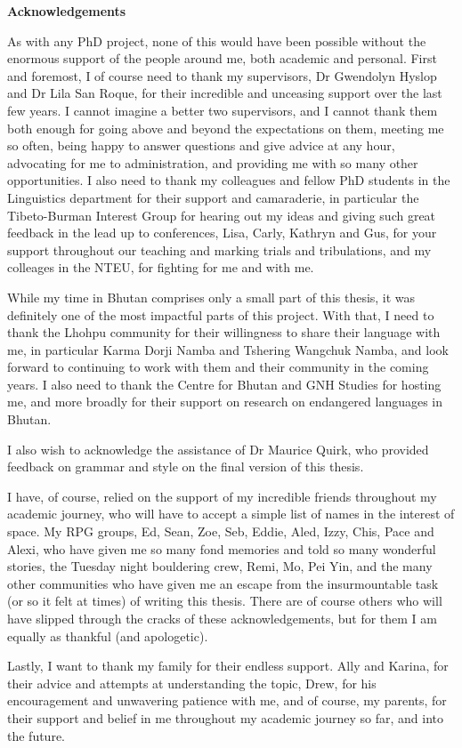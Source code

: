 \newpage
\begin{center}
    \large
    \textbf{Acknowledgements}

\end{center}
\normalsize
As with any PhD project, none of this would have been possible without the enormous support of the people around me, both academic and personal. First and foremost, I of course need to thank my supervisors, Dr Gwendolyn Hyslop and Dr Lila San Roque, for their incredible and unceasing support over the last few years. I cannot imagine a better two supervisors, and I cannot thank them both enough for going above and beyond the expectations on them, meeting me so often, being happy to answer questions and give advice at any hour, advocating for me to administration, and providing me with so many other opportunities. I also need to thank my colleagues and fellow PhD students in the Linguistics department for their support and camaraderie, in particular the Tibeto-Burman Interest Group for hearing out my ideas and giving such great feedback in the lead up to conferences, Lisa, Carly, Kathryn and Gus, for your support throughout our teaching and marking trials and tribulations, and my colleages in the NTEU, for fighting for me and with me.

While my time in Bhutan comprises only a small part of this thesis, it was definitely one of the most impactful parts of this project. With that, I need to thank the Lhohpu community for their willingness to share their language with me, in particular Karma Dorji Namba and Tshering Wangchuk Namba, and look forward to continuing to work with them and their community in the coming years. I also need to thank the Centre for Bhutan and GNH Studies for hosting me, and more broadly for their support on research on endangered languages in Bhutan.

I also wish to acknowledge the assistance of Dr Maurice Quirk, who provided feedback on grammar and style on the final version of this thesis.

I have, of course, relied on the support of my incredible friends throughout my academic journey, who will have to accept a simple list of names in the interest of space. My RPG groups, Ed, Sean, Zoe, Seb, Eddie, Aled, Izzy, Chis, Pace and Alexi, who have given me so many fond memories and told so many wonderful stories, the Tuesday night bouldering crew, Remi, Mo, Pei Yin, and the many other communities who have given me an escape from the insurmountable task (or so it felt at times) of writing this thesis.
There are of course others who will have slipped through the cracks of these acknowledgements, but for them I am equally as thankful (and apologetic).

Lastly, I want to thank my family for their endless support. Ally and Karina, for their advice and attempts at understanding the topic, Drew, for his encouragement and unwavering patience with me, and of course, my parents, for their support and belief in me throughout my academic journey so far, and into the future.
